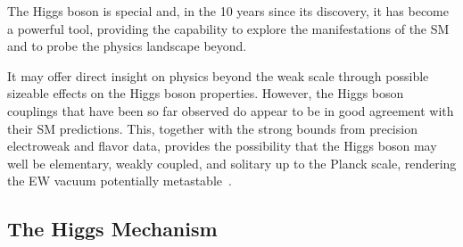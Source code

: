The Higgs boson is special and, in the 10 years since its discovery, it has become a powerful tool, providing the capability to explore the manifestations of the SM and to probe the physics landscape beyond.

It may offer direct insight on physics beyond the weak scale through possible sizeable effects on the Higgs boson properties.
However, the Higgs boson couplings that have been so far observed do appear to be in good agreement with their SM predictions.
This, together with the strong bounds from precision electroweak and flavor data, provides the possibility that the Higgs boson may well be elementary, weakly coupled, and solitary up to the Planck scale, rendering the EW vacuum potentially metastable~\cite{Degrassi:2012ry,Alekhin:2012py,Buttazzo:2013uya}.


\subsection{The Higgs Mechanism}
\label{sec:higgs_mech}

